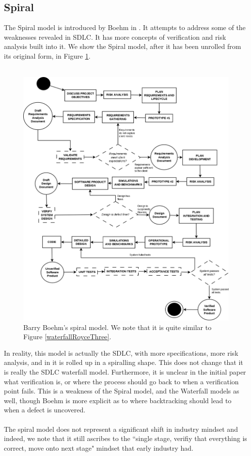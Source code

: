 \subsection{Spiral}
The Spiral model is introduced by Boehm in \cite{Boehm:1986:SMS:12944.12948}.
It attempts to address some of the weaknesses revealed in SDLC.
It has more concepts of verification and risk analysis built into it.
We show the Spiral model, after it has been unrolled from its original form, in Figure
\ref{Spiral}.\\
\\

\begin{figure}
	\centering
	\includegraphics[scale=0.3]{media/Spiral}
	\caption{Barry Boehm's spiral model. We note that it is quite similar to Figure
		\ref{waterfallRoyceThree}.}
	\label{Spiral}
\end{figure}

In reality, this model is actually the SDLC, with more specifications, more risk analysis, and
in \cite{Boehm:1986:SMS:12944.12948} it is rolled up in a spiralling shape.
This does not change that it is really the SDLC waterfall model.
Furthermore, it is unclear in the initial paper what verification is, or where the process should go
back to when a verification point fails.
This is a weakness of the Spiral model, and the Waterfall models as well, though Boehm is more
explicit as to where backtracking should lead to when a defect is uncovered.\\
\\
The spiral model does not represent a significant shift in industry mindset and indeed, we note that
it still ascribes to the ``single stage, verifiy that everything is correct, move onto next stage"
mindset that early industry had.

